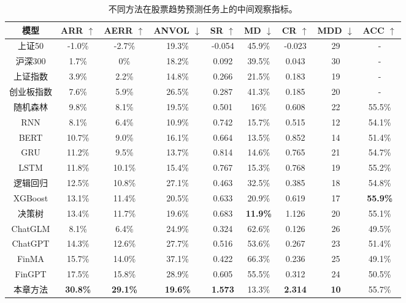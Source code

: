 \begin{table}
	\caption{\label{stock_trend_pred_table}不同方法在股票趋势预测任务上的中间观察指标。}
	\centering{}%
	\small 
	\begin{tabular}{ccccccccc}
		\toprule[2pt]
		模型 & ARR $\uparrow$ & AERR $\uparrow$ & ANVOL $\downarrow$ & SR $\uparrow$ & MD $\downarrow$ & CR $\uparrow$ & MDD $\downarrow$ & ACC $\uparrow$ \\
		\hline
		上证50 & -1.0\% & -2.7\% & 19.3\% & -0.054 & 45.9\% & -0.023 & 29 & - \\
		沪深300 & 1.7\% & 0\% & 18.2\% & 0.092 & 39.5\% & 0.043 & 30 & - \\
		上证指数 & 3.9\% & 2.2\% & 14.8\% & 0.266 & 21.5\% & 0.183 & 19 & - \\
		创业板指数 & 7.6\% & 5.9\% & 26.5\% & 0.287 & 41.3\% & 0.185 & 20 & - \\
		\hline
		随机森林 & 9.8\% & 8.1\% & 19.5\% & 0.501 & 16\% & 0.608 & 22 & 55.5\% \\
		RNN & 8.1\% & 6.4\% & 10.9\% & 0.742 & 15.7\% & 0.515 & 12 & 54.1\% \\
		BERT & 10.7\% & 9.0\% & 16.1\% & 0.664 & 13.5\% & 0.852 & 14 & 51.4\% \\
		GRU & 11.2\% & 9.5\% & 13.7\% & 0.814 & 14.6\% & 0.765 & 21 & 54.7\% \\
		LSTM & 11.8\% & 10.1\% & 15.4\% & 0.767 & 15.3\% & 0.768 & 19 & 55.2\% \\
		逻辑回归 & 12.5\% & 10.8\% & 27.1\% & 0.463 & 32.5\% & 0.385 & 18 & 54.8\% \\
		XGBoost & 13.1\% & 11.4\% & 20.5\% & 0.633 & 20.9\% & 0.619 & 17 & \textbf{55.9\%} \\
		决策树 & 13.4\% & 11.7\% & 19.6\% & 0.683 & \textbf{11.9\%} & 1.126 & 20 & 55.1\% \\
		\hline
		ChatGLM & 8.1\% & 6.4\% & 24.9\% & 0.324 & 62.6\% & 0.126 & 26 & 49.5\% \\
		ChatGPT & 14.3\% & 12.6\% & 27.7\% & 0.516 & 53.6\% & 0.267 & 23 & 51.4\% \\
		FinMA & 15.7\% & 14.0\% & 37.1\% & 0.422 & 66.3\% & 0.236 & 25 & 49.1\% \\
		FinGPT & 17.5\% & 15.8\% & 28.9\% & 0.605 & 55.5\% & 0.312 & 24 & 50.5\% \\
		\hline
		本章方法 & \textbf{30.8\%} & \textbf{29.1\%} & \textbf{19.6\%} & \textbf{1.573} & 13.3\% & \textbf{2.314} & \textbf{10} & 55.7\% \\
		\bottomrule[2pt]
	\end{tabular}
\end{table}

